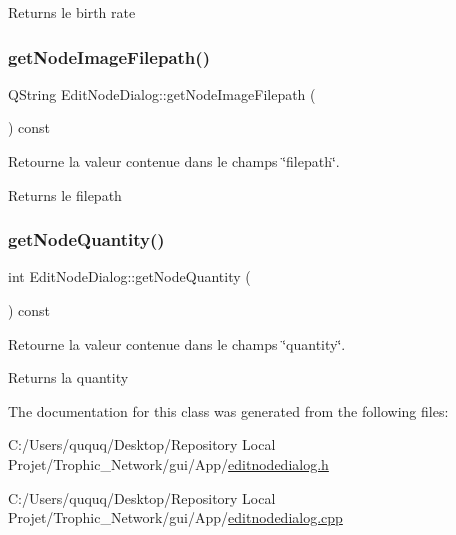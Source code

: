 \begin{DoxyReturn}{Returns}
le birth rate 
\end{DoxyReturn}
\mbox{\label{class_edit_node_dialog_a332d0500932bcb07e9e2b6bb563f2caf}} 
\subsubsection{\texorpdfstring{get\+Node\+Image\+Filepath()}{getNodeImageFilepath()}}
{\footnotesize\ttfamily Q\+String Edit\+Node\+Dialog\+::get\+Node\+Image\+Filepath (\begin{DoxyParamCaption}{ }\end{DoxyParamCaption}) const}



Retourne la valeur contenue dans le champs \char`\"{}filepath\char`\"{}. 

\begin{DoxyReturn}{Returns}
le filepath 
\end{DoxyReturn}
\mbox{\label{class_edit_node_dialog_aacda0fe9314fb3165cd56394371a1ee4}} 
\subsubsection{\texorpdfstring{get\+Node\+Quantity()}{getNodeQuantity()}}
{\footnotesize\ttfamily int Edit\+Node\+Dialog\+::get\+Node\+Quantity (\begin{DoxyParamCaption}{ }\end{DoxyParamCaption}) const}



Retourne la valeur contenue dans le champs \char`\"{}quantity\char`\"{}. 

\begin{DoxyReturn}{Returns}
la quantity 
\end{DoxyReturn}


The documentation for this class was generated from the following files\+:\begin{DoxyCompactItemize}
\item 
C\+:/\+Users/ququq/\+Desktop/\+Repository Local Projet/\+Trophic\+\_\+\+Network/gui/\+App/\mbox{\hyperlink{editnodedialog_8h}{editnodedialog.\+h}}\item 
C\+:/\+Users/ququq/\+Desktop/\+Repository Local Projet/\+Trophic\+\_\+\+Network/gui/\+App/\mbox{\hyperlink{editnodedialog_8cpp}{editnodedialog.\+cpp}}\end{DoxyCompactItemize}
